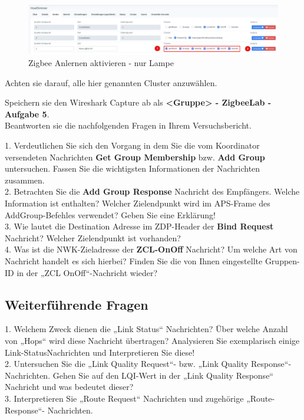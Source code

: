 \begin{figure}[H]
    \centering
    \includegraphics[width=1\textwidth]{media/Z2M-Group-Binding.png}
    \caption{Zigbee Anlernen aktivieren - nur Lampe}
\end{figure}

Achten sie darauf, alle hier genannten Cluster anzuwählen.

\begin{Aufgabe}
    Speichern sie den Wireshark Capture ab als \textbf{\grqq <Gruppe> - ZigbeeLab - Aufgabe 5\grqq{}}. \\
    Beantworten sie die nachfolgenden Fragen in Ihrem Versuchsbericht.
\end{Aufgabe}

\begin{Fragen}
1. Verdeutlichen Sie sich den Vorgang in dem Sie die vom Koordinator versendeten
Nachrichten \textbf{Get Group Membership} bzw. \textbf{Add Group} untersuchen. Fassen Sie die
wichtigsten Informationen der Nachrichten zusammen. \\

2. Betrachten Sie die \textbf{Add Group Response} Nachricht des Empfängers.
Welche Information ist enthalten? Welcher Zielendpunkt wird im APS-Frame des AddGroup-Befehles verwendet? Geben
Sie eine Erklärung! \\

3. Wie lautet die Destination Adresse im ZDP-Header der \textbf{Bind Request} Nachricht?
Welcher Zielendpunkt ist vorhanden? \\

4. Was ist die NWK-Zieladresse der \textbf{ZCL-OnOff} Nachricht? Um welche Art von Nachricht handelt es sich hierbei?
Finden Sie die von Ihnen eingestellte Gruppen-ID in der „ZCL OnOff“-Nachricht wieder? \\
\end{Fragen}

\subsection{Weiterführende Fragen}


1. Welchem Zweck dienen die „Link Status“ Nachrichten? Über welche Anzahl von „Hops“
wird diese Nachricht übertragen? Analysieren Sie exemplarisch einige Link-StatusNachrichten und Interpretieren Sie diese! \\


2. Untersuchen Sie die „Link Quality Request“- bzw. „Link Quality Response“-Nachrichten.
Gehen Sie auf den LQI-Wert in der „Link Quality Response“ Nachricht und was bedeutet
dieser? \\


3. Interpretieren Sie „Route Request“ Nachrichten und zugehörige „Route-Response“-
Nachrichten. 




